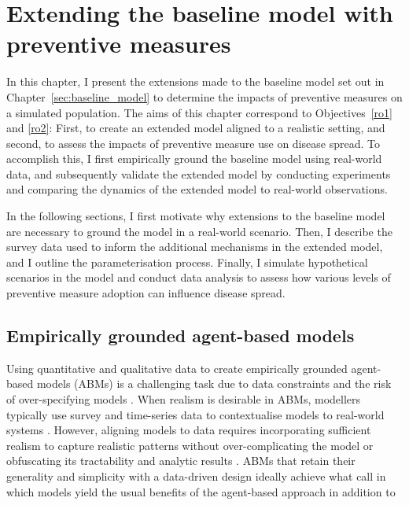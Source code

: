 \section{Extending the baseline model with preventive measures}\label{sec:extended_model}

In this chapter, I present the extensions made to the baseline model set out in Chapter~\ref{sec:baseline_model} to determine the impacts of preventive measures on a simulated population. The aims of this chapter correspond to Objectives~\ref{ro1} and \ref{ro2}: First, to create an extended model aligned to a realistic setting, and second, to assess the impacts of preventive measure use on disease spread. To accomplish this, I first empirically ground the baseline model using real-world data, and subsequently validate the extended model by conducting experiments and comparing the dynamics of the extended model to real-world observations.%

In the following sections, I first motivate why extensions to the baseline model are necessary to ground the model in a real-world scenario. Then, I describe the survey data used to inform the additional mechanisms in the extended model, and I outline the parameterisation process. Finally, I simulate hypothetical scenarios in the model and conduct data analysis to assess how various levels of preventive measure adoption can influence disease spread.

\subsection{Empirically grounded agent-based models}

Using quantitative and qualitative data to create empirically grounded agent-based models (ABMs) is a challenging task due to data constraints and the risk of over-specifying models \cite{janssen_empirically_2006}. When realism is desirable in ABMs, modellers typically use survey and time-series data to contextualise models to real-world systems \cite{polhill_using_2010, bruch_agent-based_2015, ghorbani_structuring_2015, canales_agent-based_2024}. However, aligning models to data requires incorporating sufficient realism to capture realistic patterns without over-complicating the model or obfuscating its tractability and analytic results \cite{bruch_agent-based_2015}. ABMs that retain their generality and simplicity with a data-driven design ideally achieve what \citet{bruch_agent-based_2015} call  in which models yield the usual benefits of the agent-based approach in addition to 

